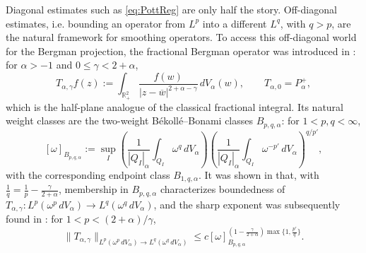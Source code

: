 \documentclass[a4paper,11pt,intlimits,oneside]{amsart}
\theoremstyle{definition}
\numberwithin{equation}{section}
\theoremstyle{definition}
\newcommand{\Be}{\begin{equation}}
\newcommand{\Ee}{\end{equation}}
\begin{document}
Diagonal estimates such as \eqref{eq:PottReg} are only half the story. Off-diagonal estimates, i.e. bounding an operator from $L^p$ into a different $L^q$, with $q>p$, are the natural framework for smoothing operators. To access this off-diagonal world for the Bergman projection, the fractional Bergman operator was introduced in \cite{Sehba4}: for $\alpha>-1$ and $0\le \gamma<2+\alpha$,
\Be\label{eq:fracBergdef}
T_{\alpha,\gamma}f(z):=\int_{\mathbb{R}_+^2}\frac{f(w)}{|z-\overline{w}|^{2+\alpha-\gamma}}\,dV_\alpha(w), \qquad T_{\alpha,0}=P_\alpha^+,
\Ee
which is the half-plane analogue of the classical fractional integral. Its natural weight classes are the two-weight B\'ekoll\'e--Bonami classes $B_{p,q,\alpha}$: for $1<p,q<\infty$,
$$[\omega]_{B_{p,q,\alpha}}:=\sup_{I}\left(\frac{1}{|Q_I|_{\alpha}}\int_{Q_I}\omega^q\,dV_{\alpha}\right)
\left(\frac{1}{|Q_I|_{\alpha}}\int_{Q_I}\omega^{-p'}\,dV_{\alpha}\right)^{q/p'},$$
with the corresponding endpoint class $B_{1,q,\alpha}$. It was shown in \cite{Sehba5} that, with $\frac{1}{q}=\frac{1}{p}-\frac{\gamma}{2+\alpha}$, membership in $B_{p,q,\alpha}$ characterizes boundedness of $T_{\alpha,\gamma}:L^p(\omega^p\,dV_\alpha)\to L^q(\omega^q\,dV_\alpha)$, and the sharp exponent was subsequently found in \cite{Sehba6}: for $1<p<(2+\alpha)/\gamma$,
\Be\label{eq:Sehbasharp1}
\|T_{\alpha,\gamma}\|_{L^p(\omega^p\,dV_\alpha)\rightarrow L^q(\omega^q\,dV_\alpha)}
\le c[\omega]_{B_{p,q,\alpha}}^{\left(1-\frac{\gamma}{2+\alpha}\right)\max\{1,\frac{p'}{q}\}}.
\Ee
\end{document}
